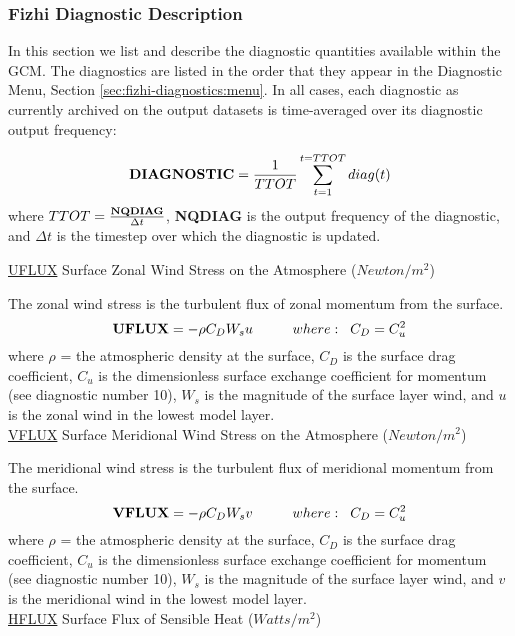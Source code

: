 \newpage

\subsubsection{Fizhi Diagnostic Description}

In this section we list and describe the diagnostic quantities available within the 
GCM.  The diagnostics are listed in the order that they appear in the 
Diagnostic Menu, Section \ref{sec:fizhi-diagnostics:menu}.
In all cases, each diagnostic as currently archived on the output datasets
is time-averaged over its diagnostic output frequency:

\[
{\bf DIAGNOSTIC} = {1 \over TTOT} \sum_{t=1}^{t=TTOT} diag(t)
\]
where $TTOT = {{\bf NQDIAG} \over \Delta t}$, {\bf NQDIAG} is the 
output frequency of the diagnostic, and $\Delta t$ is
the timestep over which the diagnostic is updated.  

{ \underline {UFLUX} Surface Zonal Wind Stress on the Atmosphere ($Newton/m^2$) } 

The zonal wind stress is the turbulent flux of zonal momentum from 
the surface. 
\[
{\bf UFLUX} =  - \rho C_D W_s u \hspace{1cm}where: \hspace{.2cm}C_D = C^2_u
\]
where $\rho$ = the atmospheric density at the surface, $C_{D}$ is the surface
drag coefficient, $C_u$ is the dimensionless surface exchange coefficient for momentum 
(see diagnostic number 10), $W_s$ is the magnitude of the surface layer wind, and $u$ is 
the zonal wind in the lowest model layer.
\\


{ \underline {VFLUX} Surface Meridional Wind Stress on the Atmosphere ($Newton/m^2$) } 

The meridional wind stress is the turbulent flux of meridional momentum from 
the surface. 
\[
{\bf VFLUX} =  - \rho C_D W_s v \hspace{1cm}where: \hspace{.2cm}C_D = C^2_u
\]
where $\rho$ = the atmospheric density at the surface, $C_{D}$ is the surface
drag coefficient, $C_u$ is the dimensionless surface exchange coefficient for momentum 
(see diagnostic number 10), $W_s$ is the magnitude of the surface layer wind, and $v$ is 
the meridional wind in the lowest model layer.
\\

{ \underline {HFLUX} Surface Flux of Sensible Heat ($Watts/m^2$) } 


